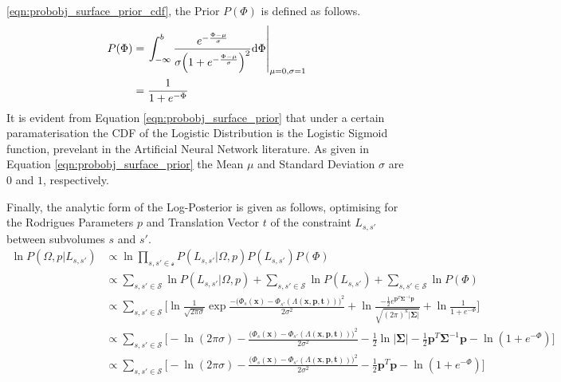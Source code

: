 \ref{eqn:probobj_surface_prior_cdf}, the Prior $P(\Phi)$ is defined as follows.
\begin{align}
  \label{eqn:probobj_surface_prior}
  P(\Phi) &= \left. \int_{-\infty}^{b} \frac
  {e^{-\frac{\Phi - \mu}{\sigma}}}
  {\sigma \Big( 1 + e^{-\frac{\Phi - \mu}{\sigma}} \Big)^{2}} {\mathrm d{\Phi}}
  \right\rvert_{\mu = 0, \sigma = 1}\\
  &= \frac{1}{1 + e^{-\Phi}}
\end{align}
It is evident from Equation \ref{eqn:probobj_surface_prior} that under a certain
paramaterisation the CDF of the Logistic Distribution is the Logistic Sigmoid
function, prevelant in the Artificial Neural Network literature. As given in
Equation \ref{eqn:probobj_surface_prior} the Mean $\mu$ and Standard Deviation
$\sigma$ are $0$ and $1$, respectively.

Finally, the analytic form of the Log-Posterior is given as follows, optimising
for the Rodrigues Parameters $p$ and Translation Vector $t$ of the constraint
$L_{s, s'}$ between subvolumes $s$ and $s'$.
\begin{align}
  \label{eqn:probobj_log_posterior}
  \ln P(\Omega, p | L_{s, s'}) &\propto \ln
  \prod_{s, s' \in \mathcal{s}} P(L_{s, s'} | \Omega, p)P(L_{s, s'})P(\Phi)\\
  &\propto \sum_{s, s' \in \mathcal{S}} \ln P(L_{s, s'} | \Omega, p) +
  \sum_{s, s' \in \mathcal{S}} \ln P(L_{s, s'}) +
  \sum_{s, s' \in \mathcal{S}} \ln P(\Phi)\\
  &\propto \sum_{s, s' \in \mathcal{S}} \Bigg[\ln \frac{1}{\sqrt{2 \pi \sigma}}
  \exp{\frac{-\big(\Phi_{s}(\mathbf{x}) - \Phi_{s'}
  (\Lambda(\mathbf{x}, \mathbf{p}, \mathbf{t}))\big)^{2}}
  {2\sigma^{2}}} +
  \ln \frac{-\frac{1}{2} e^{\mathbf{p}^{T}\mathbf{\Sigma}^{-1}\mathbf{p}}}
  {\sqrt{(2\pi)^{k}\left|\mathbf{\Sigma}\right|}} +
  \ln \frac{1}{1 + e^{-\Phi}}\Bigg]\\
  &\propto \sum_{s, s' \in \mathcal{S}} \Bigg[ -\ln(2\pi\sigma) -
  \frac{\big(\Phi_{s}(\mathbf{x}) -
  \Phi_{s'}(\Lambda(\mathbf{x}, \mathbf{p}, \mathbf{t}))\big)^{2}}{2\sigma^{2}} -
  \frac{1}{2} \ln \left|\mathbf{\Sigma}\right| -
  \frac{1}{2} \mathbf{p}^{T}\mathbf{\Sigma}^{-1}\mathbf{p} -
  \ln(1 + e^{-\Phi}) \Bigg]\\
  &\propto \sum_{s, s' \in \mathcal{S}} \Bigg[ -\ln(2\pi\sigma) -
  \frac{\big(\Phi_{s}(\mathbf{x}) -
  \Phi_{s'}(\Lambda(\mathbf{x}, \mathbf{p}, \mathbf{t}))\big)^{2}}{2\sigma^{2}} -
  \frac{1}{2} \mathbf{p}^{T}\mathbf{p} -
  \ln(1 + e^{-\Phi}) \Bigg]
\end{align}

